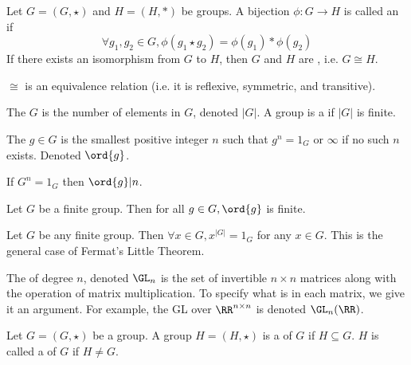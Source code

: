 \documentclass{article}
\begin{document}
\begin{defn}
  Let $G = (G, \star)$ and $H = (H, *)$ be groups. A bijection
  $\phi : G \rightarrow H$ is called an  if
  $$\forall g_1, g_2 \in G, \phi(g_1 \star g_2) = \phi(g_1) * \phi(g_2)$$
  If there exists an isomorphism from $G$ to $H$, then $G$ and $H$ are ,
  i.e. $G \cong H$. 
\end{defn}

\begin{remark}
  $\cong$ is an equivalence relation (i.e. it is reflexive, symmetric, and transitive). 
\end{remark}

\begin{defn}
  The  $G$ is the number of elements in $G$, denoted $|G|$.
  A group is a  if $|G|$ is finite.
\end{defn}

\begin{defn}
  The  $g \in G$ is the smallest positive integer $n$
  such that $g^n = 1_G$ or $\infty$ if no such $n$ exists. Denoted $\ord{g}$. 
\end{defn}

\begin{fact}
  If $G^n = 1_G$ then $\ord{g} | n$. 
\end{fact}

\begin{fact}
  Let $G$ be a finite group. Then for all $g \in G, \ord{g}$ is finite.
\end{fact}

\begin{nthm}
  Let $G$ be any finite group. Then $\forall x \in G, x^{|G|} = 1_G$ for
  any $x \in G$. This is the general case of Fermat's Little Theorem. 
\end{nthm}

\begin{defn}
  The  of degree $n$, denoted $\GL_n$ is the set of
  invertible $n \times n$ matrices along with the operation of matrix
  multiplication. To specify what is in each matrix, we give it an argument.
  For example, the GL over $\RR^{n \times n}$ is denoted $\GL_n(\RR)$. 
\end{defn}

\begin{defn}
  Let $G = (G, \star)$ be a group. A group $H = (H, \star)$ is a
   of $G$ if $H \subseteq G$. $H$ is called a 
  of $G$ if $H \neq G$. 
\end{defn}
\end{document}
